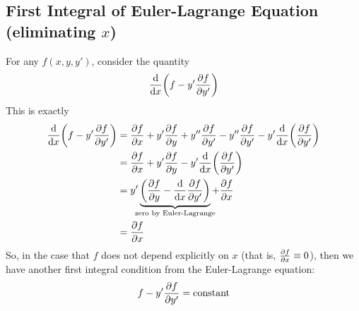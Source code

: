 \subsection{First Integral of Euler-Lagrange Equation (eliminating \(x\))}
For any \( f (x, y, y') \), consider the quantity
\[
	\dv{x}\qty(f - y' \pdv{f}{y'})
\]
This is exactly
\begin{align*}
	\dv{x}\qty(f - y' \pdv{f}{y'}) & = \pdv{f}{x} + y' \pdv{f}{y} + y''\pdv{f}{y'} - y'' \pdv{f}{y'} - y' \dv{x}\qty(\pdv{f}{y'})                     \\
	                               & = \pdv{f}{x} + y' \pdv{f}{y} - y' \dv{x}\qty(\pdv{f}{y'})                                                        \\
	                               & = y' \underbrace{\qty( \pdv{f}{y} - \dv{x}\pdv{f}{y'} )}_{\mathclap{\text{zero by Euler-Lagrange}}} + \pdv{f}{x} \\
	                               & = \pdv{f}{x}                                                                                                     \\
\end{align*}
So, in the case that \( f \) does not depend explicitly on \( x \) (that is, \( \pdv{f}{x} \equiv 0 \)), then we have another first integral condition from the Euler-Lagrange equation:
\[
	f - y' \pdv{f}{y'} = \text{constant}
\]

